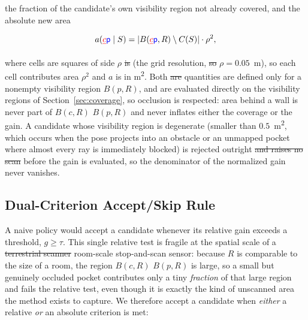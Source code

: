 \documentclass[sensors,article,submit,pdftex,moreauthors]{Definitions/mdpi}
\providecommand{\DIFadd}[1]{{\protect\color{blue} \sf #1}} %
\providecommand{\DIFdel}[1]{{\protect\color{red}\protect\scriptsize\protect\sout{#1}}} %
\providecommand{\DIFaddbegin}{} %
\providecommand{\DIFaddend}{} %
\providecommand{\DIFdelbegin}{} %
\providecommand{\DIFdelend}{} %
\begin{document}
the fraction of the candidate's own visibility region not already covered, and
the absolute new area

\begin{equation}
a(\DIFdelbegin \DIFdel{c}\DIFdelend \DIFaddbegin \DIFadd{p}\DIFaddend \mid S)=\lvert B(\DIFdelbegin \DIFdel{c}\DIFdelend \DIFaddbegin \DIFadd{p}\DIFaddend ,R)\setminus C(S)\rvert\cdot\rho^2,
\end{equation}

where \DIFaddbegin \DIFadd{cells are squares of side }\DIFaddend $\rho$ \DIFdelbegin \DIFdel{is }\DIFdelend \DIFaddbegin \DIFadd{(}\DIFaddend the grid resolution,
\DIFdelbegin \DIFdel{so }\DIFdelend \DIFaddbegin \DIFadd{$\rho=0.05$~m), so each cell contributes area $\rho^2$ and }\DIFaddend $a$ is in
m\textsuperscript{2}. Both \DIFdelbegin \DIFdel{are
}\DIFdelend \DIFaddbegin \DIFadd{quantities are defined only for a nonempty
visibility region $B(p,R)$, and are }\DIFaddend evaluated directly on the visibility
regions of Section~\ref{sec:coverage}, so occlusion is respected: area behind
a wall is never part of \DIFdelbegin \DIFdel{$B(c,R)$ }\DIFdelend \DIFaddbegin \DIFadd{$B(p,R)$ }\DIFaddend and never inflates either the coverage or the
gain. A candidate whose visibility region is degenerate (smaller than
$0.5$~m\textsuperscript{2}, which occurs when the pose projects into an
obstacle or an unmapped pocket where almost every ray is immediately blocked)
is rejected outright \DIFdelbegin \DIFdel{and raises no scan}\DIFdelend \DIFaddbegin \DIFadd{before the gain is evaluated, so the denominator of the
normalized gain never vanishes}\DIFaddend .

\subsection{Dual-Criterion Accept/Skip Rule}

A naive policy would accept a candidate whenever its relative gain exceeds a
threshold, $g\ge\tau$. This single relative test is fragile at the spatial scale
of a \DIFdelbegin \DIFdel{terrestrial scanner}\DIFdelend \DIFaddbegin \DIFadd{room-scale stop-and-scan sensor}\DIFaddend : because $R$ is comparable to the size of a
room, the region \DIFdelbegin \DIFdel{$B(c,R)$ }\DIFdelend \DIFaddbegin \DIFadd{$B(p,R)$ }\DIFaddend is large, so a small but genuinely occluded pocket contributes
only a tiny \emph{fraction} of that large region and fails the relative test,
even though it is exactly the kind of unscanned area the method exists to
capture. We therefore accept a candidate when \emph{either} a relative \emph{or}
an absolute criterion is met:
\end{document}
